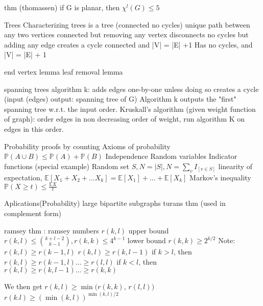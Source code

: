 \documentclass{article}
\begin{document}
thm (thomassen) if G is planar, then $\chi^l(G) \le 5$

Trees
Characterizing trees
is a tree (connected no cycles)
unique path between any two vertices
connected but removing any vertex disconnects
no cycles but adding any edge creates a cycle
connected and |V| = |E| +1
Has no cycles, and |V| = |E| + 1

end vertex lemma
leaf removal lemma

spanning trees
algorithm k: adds edges one-by-one unless doing so creates a cycle (input (edges) output: spanning tree of G)
Algorithm k outputs the "first" spanning tree w.r.t. the input order.
Kruskall's algorithm (given weight function of graph): order edges in non decreasing order of weight, run algorithm K on edges in this order.

Probability
proofs by counting
Axioms of probability
$\mathbb{P}(A \cup B) \le \mathbb{P}(A) + \mathbb{P}(B)$
Independence
Random variables
Indicator functions (special example)
Random set $S, N=|S|, N = \sum_{v}I_{[v \in S]}$
linearity of expectation, $\mathbb{E}[X_1 + X_2 + \dots X_k] = \mathbb{E}[X_1] + \dots + \mathbb{E}[X_k]$
Markov's inequality $\mathbb{P}(X \ge t) \le \frac{\mathbb{E}X}{t}$

Aplications(Probability)
large bipartite subgraphs
turans thm (used in complement form)

ramsey thm : ramsey numbers $r(k,l)$
upper bound $r(k,l) \le {k+l -2 \choose k-1}, r(k,k) \le 4^{k-1}$
lower bound $r(k,k) \ge 2^{k/2}$
Note: $r(k,l) \ge r(k-1, l)$
$r(k,l) \ge r(k, l-1)$
if $k>l$, then $r(k,l) \ge r(k-1, l)  \dots \ge  r(l,l)$
if $k<l$, then $r(k,l) \ge r(k, l-1) \dots \ge r(k,k)$

We then get $r(k,l) \ge \min(r(k,k)$, $r(l,l))$
$r(k.l) \ge (\min(k,l))^{\min(k,l)/2}$

 
\end{document}
